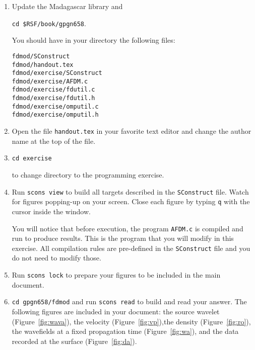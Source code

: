 \begin{enumerate}

\item Update the Madagascar library and 

\texttt{cd \$RSF/book/gpgn658}.

You should have in your directory the
following files:

\texttt{fdmod/SConstruct} \\
\texttt{fdmod/handout.tex} \\
\texttt{fdmod/exercise/SConstruct} \\
\texttt{fdmod/exercise/AFDM.c} \\
\texttt{fdmod/exercise/fdutil.c} \\
\texttt{fdmod/exercise/fdutil.h} \\
\texttt{fdmod/exercise/omputil.c} \\
\texttt{fdmod/exercise/omputil.h}

\item 
Open the file \texttt{handout.tex} in your favorite text editor and
change the author name at the top of the file.

\item 
\texttt{cd exercise} \par
to change directory to the programming exercise.

\item 
Run \texttt{scons view} to build all targets described in the
\texttt{SConstruct} file. Watch for figures popping-up on your screen.
Close each figure by typing \texttt{q} with the cursor inside the
window.

You will notice that before execution, the program \texttt{AFDM.c} is
compiled and run to produce results. This is the program that you will
modify in this exercise. All compilation rules are pre-defined in the
\texttt{SConstruct} file and you do not need to modify those.

\item
Run \texttt{scons lock} to prepare your figures to be included in the
main document.

\item 
\texttt{cd gpgn658/fdmod} and run \texttt{scons read} to build and 
read your answer. The following figures are included in your document:
the source wavelet (Figure~\ref{fig:wava}), the velocity
(Figure~\ref{fig:vp}),the density (Figure~\ref{fig:ro}), the
wavefields at a fixed propagation time (Figure~\ref{fig:wa}), and the
data recorded at the surface (Figure~\ref{fig:da}).


\end{enumerate}
